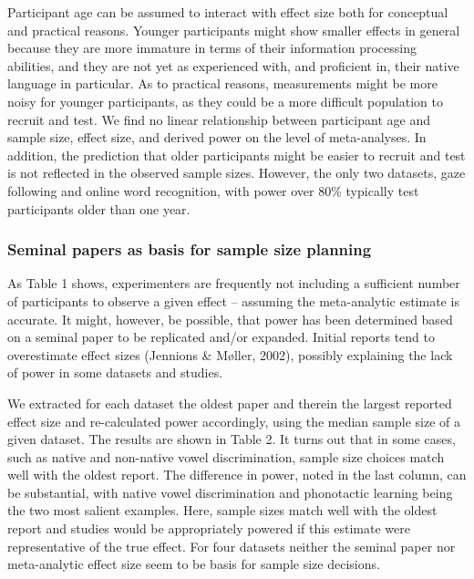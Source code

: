 \documentclass[english,floatsintext,man]{apa6}
\begin{document}
Participant age can be assumed to interact with effect size both for
conceptual and practical reasons. Younger participants might show
smaller effects in general because they are more immature in terms of
their information processing abilities, and they are not yet as
experienced with, and proficient in, their native language in
particular. As to practical reasons, measurements might be more noisy
for younger participants, as they could be a more difficult population
to recruit and test. We find no linear relationship between participant
age and sample size, effect size, and derived power on the level of
meta-analyses. In addition, the prediction that older participants might
be easier to recruit and test is not reflected in the observed sample
sizes. However, the only two datasets, gaze following and online word
recognition, with power over 80\% typically test participants older than
one year.

\subsubsection{Seminal papers as basis for sample size
planning}\label{seminal-papers-as-basis-for-sample-size-planning}

As Table 1 shows, experimenters are frequently not including a
sufficient number of participants to observe a given effect -- assuming
the meta-analytic estimate is accurate. It might, however, be possible,
that power has been determined based on a seminal paper to be replicated
and/or expanded. Initial reports tend to overestimate effect sizes
(Jennions \& Møller, 2002), possibly explaining the lack of power in
some datasets and studies.

We extracted for each dataset the oldest paper and therein the largest
reported effect size and re-calculated power accordingly, using the
median sample size of a given dataset. The results are shown in Table 2.
It turns out that in some cases, such as native and non-native vowel
discrimination, sample size choices match well with the oldest report.
The difference in power, noted in the last column, can be substantial,
with native vowel discrimination and phonotactic learning being the two
most salient examples. Here, sample sizes match well with the oldest
report and studies would be appropriately powered if this estimate were
representative of the true effect. For four datasets neither the seminal
paper nor meta-analytic effect size seem to be basis for sample size
decisions.
\end{document}
